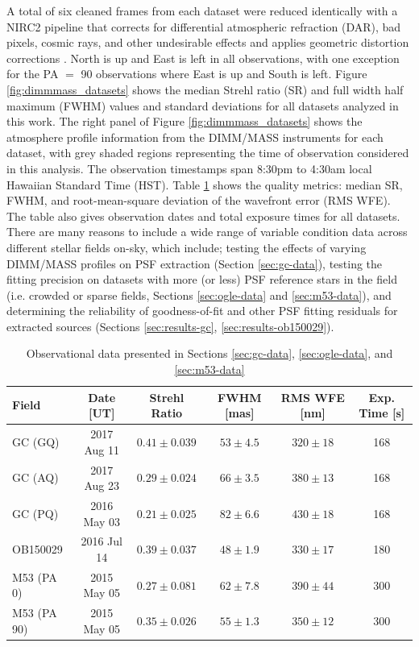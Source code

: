 \documentclass[]{spie}  %
\begin{document}
\indent A total of six cleaned frames from each dataset were reduced identically with a NIRC2 pipeline that corrects for differential atmospheric refraction (DAR), bad pixels, cosmic rays, and other undesirable effects \cite{ghez:2008a, lu:2008a} and applies geometric distortion corrections \cite{lu:2008a, service:2016a}. North is up and East is left in all observations, with one exception for the PA $=$ 90 observations where East is up and South is left. Figure \ref{fig:dimmmass_datasets} shows the median Strehl ratio (SR) and full width half maximum (FWHM) values and standard deviations for all datasets analyzed in this work. The right panel of Figure \ref{fig:dimmmass_datasets} shows the atmosphere profile information from the DIMM/MASS instruments for each dataset, with grey shaded regions representing the time of observation considered in this analysis. The observation timestamps span 8:30pm to 4:30am local Hawaiian Standard Time (HST). Table \ref{tab:fields-metrics} shows the quality metrics: median SR, FWHM, and root-mean-square deviation of the wavefront error (RMS WFE). The table also gives observation dates and total exposure times for all datasets.
\\
\indent There are many reasons to include a wide range of variable condition data across different stellar fields on-sky, which include; testing the effects of varying DIMM/MASS profiles on PSF extraction (Section \ref{sec:gc-data}), testing the fitting precision on datasets with more (or less) PSF reference stars in the field (i.e. crowded or sparse fields, Sections \ref{sec:ogle-data} and \ref{sec:m53-data}), and determining the reliability of goodness-of-fit and other PSF fitting residuals for extracted sources (Sections \ref{sec:results-gc}, \ref{sec:results-ob150029}).

\begin{table}[!h]
\centering
\caption{Observational data presented in Sections \ref{sec:gc-data}, \ref{sec:ogle-data}, and \ref{sec:m53-data}} \label{tab:fields-metrics}
\begin{tabular}{lccccc}
\hline
        Field &  Date [UT] &  Strehl Ratio &  FWHM [mas] &  RMS WFE [nm] & Exp. Time [s] \\\hline\hline
        GC (GQ) &   2017 Aug 11 & $0.41 \pm 0.039$ & $53 \pm 4.5$ & $320 \pm 18$ & 168\\
        GC (AQ) &   2017 Aug 23 & $0.29 \pm 0.024$ & $66 \pm 3.5$ & $380 \pm 13$ & 168\\
        GC (PQ) &   2016 May 03 & $0.21 \pm 0.025$ & $82 \pm 6.6$ & $430 \pm 18$ & 168\\
        OB150029 &    2016 Jul 14 &  $0.39 \pm 0.037$ & $48 \pm 1.9$ & $330 \pm 17$ & 180\\
        M53 (PA 0) &   2015 May 05 &  $0.27 \pm 0.081$ & $62 \pm 7.8$ & $390 \pm 44$ & 300\\
        M53 (PA 90) &   2015 May 05 & $0.35 \pm 0.026$ & $55 \pm 1.3$ & $350 \pm 12$ & 300\\\hline
\end{tabular}
\end{table}
\end{document}
